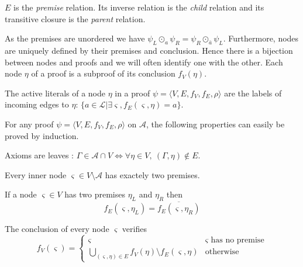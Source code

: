\documentclass{llncs}
\newcommand{\dual}[1]{{\ensuremath{\bar{#1}}}}
\begin{document}
$E$ is the \emph{premise} relation. Its inverse relation is the \emph{child} relation and its
transitive closure is the \emph{parent} relation. 

As the premises are unordered we have $\psi_L \odot_a \psi_R = \psi_R \odot_\dual{a} \psi_L$.
Furthermore, nodes are uniquely defined by their premises and conclusion. Hence there is a bijection
between nodes and proofs and we will often identify one with the other. Each node $\eta$ of a proof
is a subproof of its conclusion $f_V(\eta)$.

\begin{definition}
The active literals of a node $\eta$ in a proof $\psi = \langle V,E,f_V,f_E,\rho \rangle$ are the
labels of incoming edges to $\eta$: $\{a \in \mathcal{L} | \exists \varsigma, f_E(\varsigma,\eta) =
a\}$.
\end{definition}

For any proof $\psi = \langle V,E,f_V,f_E,\rho \rangle$ on $\mathcal{A}$, the following properties
can easily be proved by induction.

\begin{property}
\label{prop:proof_leaf}
Axioms are leaves : $\Gamma \in \mathcal{A} \cap V \Leftrightarrow \forall \eta \in V ,~
(\Gamma,\eta) \notin E$.
\end{property}

\begin{property}
Every inner node $\varsigma \in V \setminus \mathcal{A}$ has exactely two premises.
\end{property}

\begin{property}
\label{prop:proof_edges}
If a node $\varsigma \in V$ has two premises $\eta_L$ and $\eta_R$ then
\begin{equation*}
f_E(\varsigma,\eta_L) = \overline{f_E(\varsigma,\eta_R)}
\end{equation*}
\end{property}

\begin{property}
\label{prop:proof_conclusion}
The conclusion of every node $\varsigma$ verifies
\begin{equation*}
  f_V(\varsigma) = \begin{cases}
    \varsigma & \varsigma \text{ has no premise} \\
    \bigcup_{(\varsigma,\eta) \in E}{f_V(\eta) \setminus f_E(\varsigma,\eta)} & \text{otherwise}
  \end{cases}
\end{equation*}
\end{property}
\end{document}
